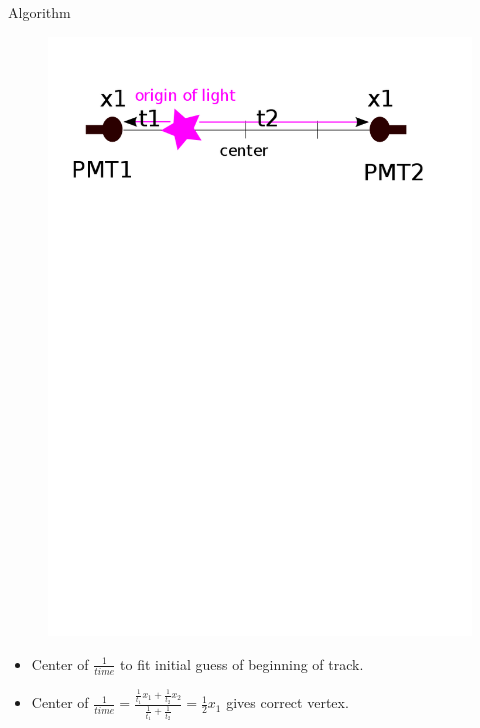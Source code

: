 \documentclass{beamer} %
\begin{document}
\begin{frame}{Algorithm}
	\begin{figure}
		\includegraphics[width=\textwidth,height=0.7\textheight,keepaspectratio]
			{material/center_of_one_over_time.png}
	\end{figure}
	\begin{itemize}
		\item Center of $\frac{1}{time}$ to fit initial guess of beginning of track.
		\item Center of $\frac{1}{time} = \frac{\frac{1}{t_1}x_1 +
			\frac{1}{t_2}x_2}{\frac{1}{t_1} + \frac{1}{t_2}} = \frac{1}{2}x_1$
			gives correct vertex.
	\end{itemize}
\end{frame}
\end{document}
